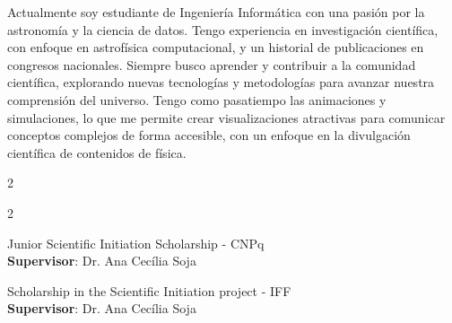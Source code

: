 \begin{fullwidth}
  


Actualmente soy estudiante de Ingeniería Informática con una pasión por la astronomía y la ciencia de datos. Tengo experiencia en investigación científica, con enfoque en astrofísica computacional, y un historial de publicaciones en congresos nacionales. Siempre busco aprender y contribuir a la comunidad científica, explorando nuevas tecnologías y metodologías para avanzar nuestra comprensión del universo. Tengo como pasatiempo las animaciones y simulaciones, lo que me permite crear visualizaciones atractivas para comunicar conceptos complejos de forma accesible, con un enfoque en la divulgación científica de contenidos de física.

\medskip


\begin{multicols}{2}

\columnbreak

\end{multicols}

\smallskip


\begin{multicols}{2}

Junior Scientific Initiation Scholarship - CNPq \\
\textbf{Supervisor}: Dr. Ana Cecília Soja

\divider

Scholarship in the Scientific Initiation project - IFF \\
\textbf{Supervisor}: Dr. Ana Cecília Soja

\columnbreak


\end{multicols}
\end{fullwidth}
